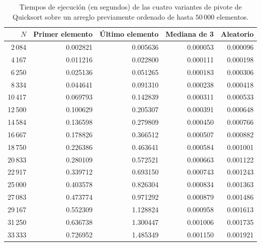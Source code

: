 \begin{table}[!h]
    \centering
    \footnotesize
    \caption{Tiempos de ejecución (en segundos) de las cuatro variantes de pivote de Quicksort sobre un arreglo previamente ordenado de hasta $50\,000$ elementos.}
    \label{tab:quicksort_sorted}
    \begin{tabular}{r|rrrr}
        \hline
        $N$     & Primer elemento & Último elemento & Mediana de 3 & Aleatorio \\
        \hline
        2\,084  & 0.002821        & 0.005636        & 0.000053     & 0.000096  \\
        4\,167  & 0.011216        & 0.022800        & 0.000111     & 0.000198  \\
        6\,250  & 0.025136        & 0.051265        & 0.000183     & 0.000306  \\
        8\,334  & 0.044641        & 0.091310        & 0.000238     & 0.000418  \\
        10\,417 & 0.069793        & 0.142839        & 0.000311     & 0.000533  \\
        12\,500 & 0.100629        & 0.205307        & 0.000391     & 0.000648  \\
        14\,584 & 0.136598        & 0.279809        & 0.000450     & 0.000766  \\
        16\,667 & 0.178826        & 0.366512        & 0.000507     & 0.000882  \\
        18\,750 & 0.226386        & 0.463641        & 0.000584     & 0.001001  \\
        20\,833 & 0.280109        & 0.572521        & 0.000663     & 0.001122  \\
        22\,917 & 0.339712        & 0.693150        & 0.000743     & 0.001243  \\
        25\,000 & 0.403578        & 0.826304        & 0.000834     & 0.001363  \\
        27\,083 & 0.473774        & 0.971292        & 0.000879     & 0.001486  \\
        29\,167 & 0.552309        & 1.128824        & 0.000958     & 0.001613  \\
        31\,250 & 0.636738        & 1.300447        & 0.001006     & 0.001735  \\
        33\,333 & 0.726952        & 1.485349        & 0.001150     & 0.001921  \\

\end{tabular}
\end{table}
